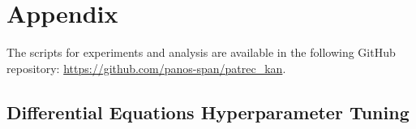 \documentclass[conference]{IEEEtran}
\begin{document}



\clearpage
\onecolumn
\appendix

\section{Appendix}

\noindent
The scripts for experiments and analysis are available in the following GitHub repository: \url{https://github.com/panos-span/patrec_kan}.


\subsection{Differential Equations Hyperparameter Tuning}
\end{document}
